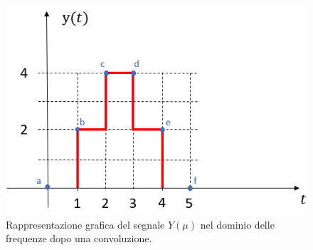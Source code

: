 \documentclass[a4paper]{article}
\begin{document}
	\begin{figure}[!htp]
		\centering
		\includegraphics[width=.7\textwidth]{img/fig_10.png}
		\caption*{Rappresentazione grafica del segnale $Y\left(\mu\right)$ nel dominio delle frequenze dopo una convoluzione.}
	\end{figure}
	
\end{document}
